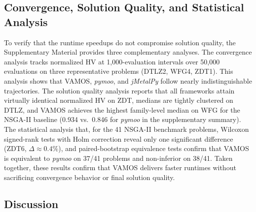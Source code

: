 \documentclass[final,5p,times,twocolumn]{elsarticle}
\newcommand{\VAMOS}{VAMOS}
\begin{document}

\subsection{Convergence, Solution Quality, and Statistical Analysis}

To verify that the runtime speedups do not compromise solution quality, the Supplementary Material provides three complementary analyses. The convergence analysis tracks normalized HV at 1{,}000-evaluation intervals over 50{,}000 evaluations on three representative problems (DTLZ2, WFG4, ZDT1). This analysis shows that \VAMOS{}, \textit{pymoo}, and \textit{jMetalPy} follow nearly indistinguishable trajectories. The solution quality analysis reports that all frameworks attain virtually identical normalized HV on ZDT, medians are tightly clustered on DTLZ, and \VAMOS{} achieves the highest family-level median on WFG for the NSGA-II baseline (0.934 vs.\ 0.846 for \textit{pymoo} in the supplementary summary). The statistical analysis  that, for the 41 NSGA-II benchmark problems, Wilcoxon signed-rank tests with Holm correction reveal only one significant difference (ZDT6, $\Delta \approx 0.4\%$), and paired-bootstrap equivalence tests confirm that \VAMOS{} is equivalent to \textit{pymoo} on 37/41 problems and non-inferior on 38/41. Taken together, these results confirm that \VAMOS{} delivers faster runtimes without sacrificing convergence behavior or final solution quality.

\subsection{Discussion}
\label{sec:discussion}
\end{document}
